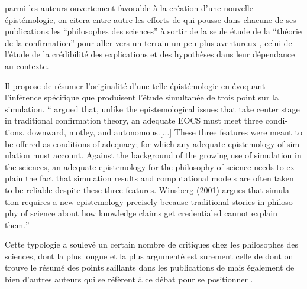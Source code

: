 
parmi les auteurs ouvertement favorable à la création d'une nouvelle épistémologie, on citera entre autre les efforts de \autocites{Winsberg2001, Winsberg2009, Winsberg2013} qui pousse dans chacune de ses publications les \enquote{philosophes des sciences} à sortir de la seule étude de la \enquote{théorie de la confirmation} pour aller vers un terrain un peu plus aventureux , celui de l'étude de la crédibilité des explications et des hypothèses dans leur dépendance au contexte.

Il propose de résumer l'originalité d'une telle épistémologie en évoquant l'inférence spécifique que produisent l'étude simultanée de trois point sur la simulation. \foreignquote{english}{ \textcite{Winsberg2001} argued that, unlike the epistemological issues that take center stage in traditional confirmation theory, an adequate EOCS must meet three conditions. 
downward, motley, and autonomous.[...] These three features were meant to be offered as conditions of adequacy; for which any adequate epistemology of simulation must account. Against the background of the growing use of simulation in the sciences, an adequate epistemology for the philosophy of science needs to explain the fact that simulation results and computational models are often taken to be reliable despite these three features. Winsberg (2001) argues that simulation requires a new epistemology precisely because traditional stories in philosophy of science about how knowledge claims get credentialed cannot explain them.}

Cette typologie a soulevé un certain nombre de critiques chez les philosophes des sciences, dont la plus longue et la plus argumenté est surement celle de \textcite{Frigg2009} dont on trouve le résumé des points saillants dans les publications de \textcites{Winsberg2009, Winsberg2013} mais également de bien d'autres auteurs qui se réfèrent à ce débat pour se positionner \textcites{Yanoff2010, Eckhart2010}.

